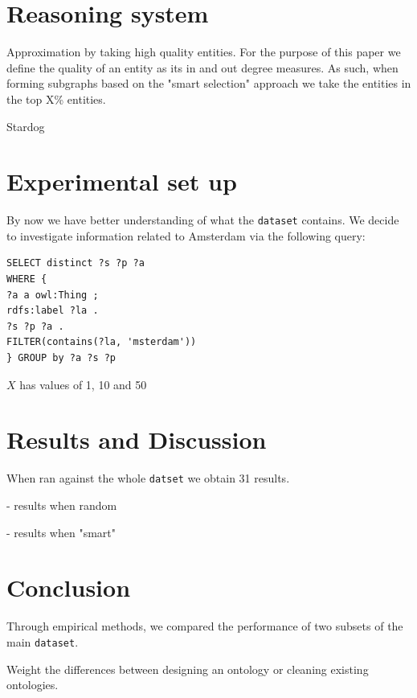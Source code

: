 \documentclass[runningheads,a4paper]{../../StyleFiles/llncs}
\begin{document}
\section{Reasoning system}
Approximation by taking high quality entities. For the purpose of this paper we define the quality of an entity as its in and out degree measures. As such, when forming subgraphs based on the "smart selection" approach we take the entities in the top X\% entities.

Stardog

\section{Experimental set up}
By now we have better understanding of what the \texttt{dataset} contains. We decide to investigate information related to Amsterdam via the following query:

\begin{lstlisting}[captionpos=b, caption=SPARQL query for calculating out degree of entities, label=lst:sparql, basicstyle=\ttfamily\small,frame=bt]
SELECT distinct ?s ?p ?a
WHERE { 
?a a owl:Thing ;
rdfs:label ?la .
?s ?p ?a .
FILTER(contains(?la, 'msterdam'))
} GROUP by ?a ?s ?p
\end{lstlisting}

$X$ has values of 1, 10 and 50

\section{Results and Discussion}
When ran against the whole \texttt{datset} we obtain 31 results. 

- results when random 

- results when "smart"

\section{Conclusion}
Through empirical methods, we compared the performance of two subsets of the main \texttt{dataset}. 

Weight the differences between designing an ontology or cleaning existing ontologies.



\end{document}
